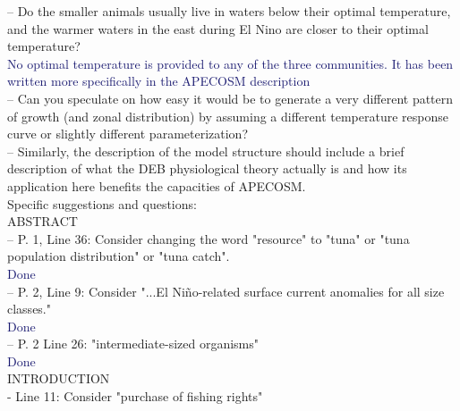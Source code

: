 \documentclass[12pt]{article}
\newcommand{\resp}[1]{\textcolor{MidnightBlue}{#1}}
\begin{document}

-- Do the smaller animals usually live in waters below their optimal temperature, and the warmer waters in the east during El Nino are closer to their optimal temperature?\\

\resp{No optimal temperature is provided to any of the three communities. It has been written more specifically in the APECOSM description}\\

-- Can you speculate on how easy it would be to generate a very different pattern of growth (and zonal distribution) by assuming a different temperature response curve or slightly different parameterization?\\


-- Similarly, the description of the model structure should include a brief description of what the DEB physiological theory actually is and how its application here benefits the capacities of APECOSM.\\


Specific suggestions and questions:\\

ABSTRACT\\

-- P. 1, Line 36: Consider changing the word "resource" to "tuna" or "tuna population distribution" or "tuna catch".\\

\resp{Done} \\

-- P. 2, Line 9: Consider "...El Niño-related surface current anomalies for all size classes."\\

\resp{Done}\\

-- P. 2 Line 26: "intermediate-sized organisms"\\

\resp{Done}\\

INTRODUCTION\\

- Line 11: Consider "purchase of fishing rights"\\
\end{document}
